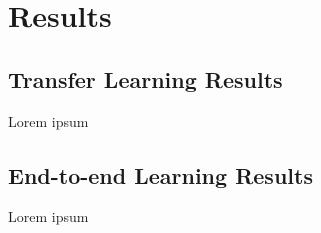 \chapter{Results}
\label{chapter:results}

\section{Transfer Learning Results}

Lorem ipsum

\section{End-to-end Learning Results}

Lorem ipsum
